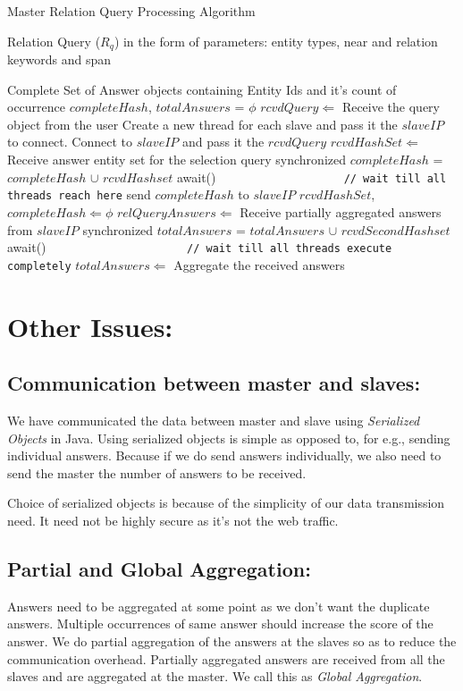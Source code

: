 \documentclass[11pt]{report}
\newcommand\INPUT{\item[\textbf{Input:}]}
\newcommand\OUTPUT{\item[\textbf{Output:}]}
\begin{document}
\begin{algorithm}
 \caption{Master Relation Query Processing Algorithm}
 \begin{algorithmic}[1]
\INPUT Relation Query ($R_q$) in the form of parameters: entity types, near and relation keywords and span
\OUTPUT Complete Set of Answer objects containing Entity Ids and it's count of occurrence
\STATE $completeHash$, $totalAnswers$ = $\phi$
\STATE $rcvdQuery \Leftarrow$ Receive the query object from the user
\STATE Create a new thread for each slave and pass it the $slaveIP$ to connect.
\STATE Connect to $slaveIP$ and pass it the $rcvdQuery$
  \STATE $rcvdHashSet \Leftarrow$ Receive answer entity set for the selection query
  \STATE synchronized $completeHash$ = $completeHash$ $\cup$ $rcvdHashset$
  \STATE await()\verb+                    // wait till all threads reach here+
  \STATE send $completeHash$ to $slaveIP$
  \STATE $rcvdHashSet$, $completeHash \Leftarrow \phi$ 
\ENDFOR
\STATE $relQueryAnswers \Leftarrow$ Receive partially aggregated answers from $slaveIP$
\STATE synchronized $totalAnswers$ = $totalAnswers$ $\cup$ $rcvdSecondHashset$
\ENDFOR
\STATE await()\verb+                      // wait till all threads execute completely+
\STATE $totalAnswers \Leftarrow$ Aggregate the received answers
 \end{algorithmic}
\end{algorithm}
\section{Other Issues:}
\subsection{Communication between master and slaves:}
We have communicated the data between master and slave using \emph{Serialized Objects} in Java. Using serialized objects
is simple as opposed to, for e.g., sending individual answers. Because if we do send answers individually, we also need to send
the master the number of answers to be received. 

Choice of serialized objects is because of the simplicity of our data transmission need. It need not be highly secure as it's not the web traffic.

\subsection{Partial and Global Aggregation:}
Answers need to be aggregated at some point as we don't want the duplicate answers. Multiple occurrences of same answer should increase the score 
of the answer. We do partial aggregation of the answers at the slaves so as to reduce the communication overhead. Partially aggregated answers
are received from all the slaves and are aggregated at the master. We call this as \textit{Global Aggregation}.
\end{document}
